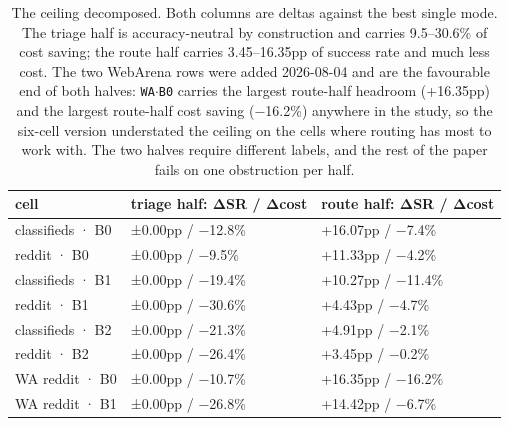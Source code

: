 \begin{table}[tp]
\centering
\caption{The ceiling decomposed. Both columns are deltas against the best single mode. The triage half is accuracy-neutral by construction and carries 9.5--30.6\% of cost saving; the route half carries 3.45--16.35pp of success rate and much less cost. The two WebArena rows were added 2026-08-04 and are the favourable end of both halves: \texttt{WA$\cdot$B0} carries the largest route-half headroom (+16.35pp) and the largest route-half cost saving (−16.2\%) anywhere in the study, so the six-cell version understated the ceiling on the cells where routing has most to work with. The two halves require different labels, and the rest of the paper fails on one obstruction per half.}
\label{tab:pb02}
\footnotesize
\setlength{\tabcolsep}{3pt}
\begin{tabular}{@{}lll@{}}
\toprule
cell & triage half: ΔSR / Δcost & route half: ΔSR / Δcost \\
\midrule
classifieds · B0 & ±0.00pp / −12.8\% & +16.07pp / −7.4\% \\
reddit · B0 & ±0.00pp / −9.5\% & +11.33pp / −4.2\% \\
classifieds · B1 & ±0.00pp / −19.4\% & +10.27pp / −11.4\% \\
reddit · B1 & ±0.00pp / −30.6\% & +4.43pp / −4.7\% \\
classifieds · B2 & ±0.00pp / −21.3\% & +4.91pp / −2.1\% \\
reddit · B2 & ±0.00pp / −26.4\% & +3.45pp / −0.2\% \\
WA reddit · B0 & ±0.00pp / −10.7\% & +16.35pp / −16.2\% \\
WA reddit · B1 & ±0.00pp / −26.8\% & +14.42pp / −6.7\% \\
\bottomrule
\end{tabular}
\end{table}

